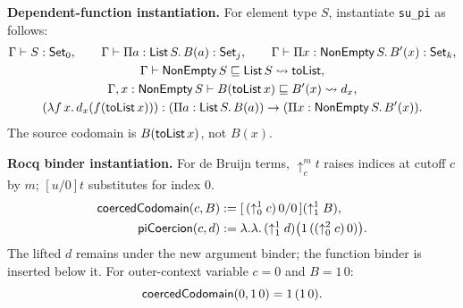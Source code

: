 \textbf{Dependent-function instantiation.}
For element type $S$, instantiate \texttt{su\_pi} as follows:
\[
\begin{gathered}
 \Gamma\vdash S:\mathsf{Set}_0,\qquad
 \Gamma\vdash \Pi a:\mathsf{List}\,S.\,B(a):\mathsf{Set}_j,\qquad
 \Gamma\vdash \Pi x:\mathsf{NonEmpty}\,S.\,B'(x):\mathsf{Set}_k,\\
 \Gamma\vdash \mathsf{NonEmpty}\,S\sqsubseteq \mathsf{List}\,S\rightsquigarrow \mathsf{toList},\\
 \Gamma,x:\mathsf{NonEmpty}\,S
   \vdash B(\mathsf{toList}\,x)\sqsubseteq B'(x)\rightsquigarrow d_x,\\
 (\lambda f\,x.\,d_x(f(\mathsf{toList}\,x))):
   (\Pi a:\mathsf{List}\,S.\,B(a))\to
   (\Pi x:\mathsf{NonEmpty}\,S.\,B'(x)).
\end{gathered}
\]
The source codomain is $B(\mathsf{toList}\,x)$, not $B(x)$.

\textbf{Rocq binder instantiation.}
For de Bruijn terms, $\uparrow^m_c t$ raises indices at cutoff $c$ by $m$;
$[u/0]t$ substitutes for index $0$.
\[
\begin{aligned}
 \mathsf{coercedCodomain}(c,B)
   &:=[\,(\uparrow^1_0 c)\,0/0\,](\uparrow^1_1 B),\\
 \mathsf{piCoercion}(c,d)
   &:=\lambda.\lambda.\,
       (\uparrow^1_1 d)\bigl(1\,((\uparrow^2_0 c)\,0)\bigr).
\end{aligned}
\]
The lifted $d$ remains under the new argument binder; the function binder
is inserted below it. For outer-context variable $c=0$ and $B=1\,0$:
\[
 \mathsf{coercedCodomain}(0,1\,0)=1\,(1\,0).
\]

